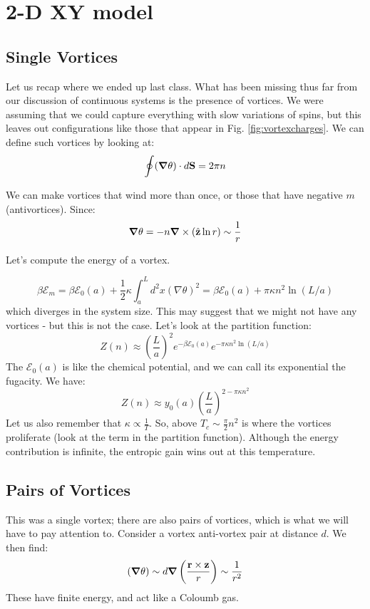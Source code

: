 \section{2-D XY model}
\subsection{Single Vortices}
Let us recap where we ended up last class. What has been missing thus far from our discussion of continuous systems is the presence of vortices. We were assuming that we could capture everything with slow variations of spins, but this leaves out configurations like those that appear in Fig. \ref{fig:vortexcharges}. We can define such vortices by looking at:
\begin{equation}
    \oint (\nabla \theta) \cdot d\v{S} = 2\pi n
\end{equation}

We can make vortices that wind more than once, or those that have negative $m$ (antivortices). Since:
\begin{equation}
    \nabla \theta  = -n\nabla \times (\zhat \ln r) \sim \frac{1}{r}
\end{equation}

Let's compute the energy of a vortex.

\begin{equation}
    \beta \mathcal{E}_m = \beta \mathcal{E}_0(a) + \frac{1}{2}\kappa\int_a^L d^2x (\nabla \theta)^2 = \beta \mathcal{E}_0(a) + \pi \kappa n^2 \ln(L/a)
\end{equation}
which diverges in the system size. This may suggest that we might not have any vortices - but this is not the case. Let's look at the partition function:
\begin{equation}
    Z(n) \approx \left(\frac{L}{a}\right)^2 e^{-\beta \mathcal{E}_0(a)} e^{-\pi \kappa n^2 \ln(L/a)}
\end{equation}
The $\mathcal{E}_0(a)$ is like the chemical potential, and we can call its exponential the fugacity. We have:
\begin{equation}
    Z(n) \approx y_0(a) \left(\frac{L}{a}\right)^{2 - \pi\kappa n^2}
\end{equation}
Let us also remember that $\kappa \propto \frac{1}{T}$. So, above $T_c \sim \frac{\pi}{2}n^2$ is where the vortices proliferate (look at the term in the partition function). Although the energy contribution is infinite, the entropic gain wins out at this temperature.

\subsection{Pairs of Vortices}
This was a single vortex; there are also pairs of vortices, which is what we will have to pay attention to. Consider a vortex anti-vortex pair at distance $d$. We then find:
\begin{equation}
    (\nabla \theta) \sim d \nabla\left(\frac{\v{r} \times \v{z}}{r}\right) \sim \frac{1}{r^2}
\end{equation}
These have finite energy, and act like a Coloumb gas.

